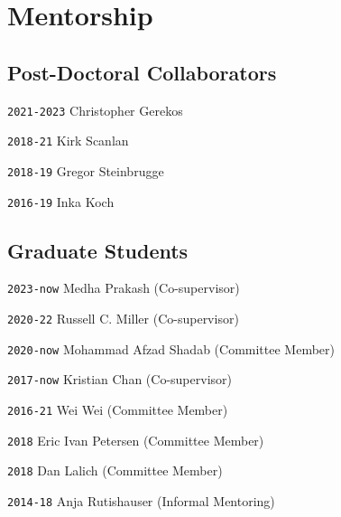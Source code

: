 \section*{Mentorship}

\TabPositions{6em,20em,28em}

\subsection*{Post-Doctoral Collaborators}

\noindent \texttt{2021-2023} \tab Christopher Gerekos 

\noindent \texttt{2018-21} \tab Kirk Scanlan 

\noindent \texttt{2018-19} \tab Gregor Steinbrugge

\noindent \texttt{2016-19} \tab Inka Koch

\vspace{-1em}
\subsection*{Graduate Students}

\noindent \texttt{2023-now} \tab Medha Prakash \tab [PhD] \tab (Co-supervisor)

\noindent \texttt{2020-22} \tab Russell C. Miller \tab [MS] \tab (Co-supervisor)

\noindent \texttt{2020-now} \tab Mohammad Afzad Shadab \tab [PhD] \tab (Committee Member)

\noindent \texttt{2017-now} \tab Kristian Chan \tab [PhD] \tab (Co-supervisor)

\noindent \texttt{2016-21} \tab Wei Wei \tab [PhD] \tab (Committee Member)

\noindent \texttt{2018} \tab Eric Ivan Petersen  \tab [PhD] \tab (Committee Member)

\noindent \texttt{2018} \tab Dan Lalich \tab [PhD] \tab (Committee Member)

\noindent \texttt{2014-18} \tab Anja Rutishauser  \tab (Informal Mentoring)


